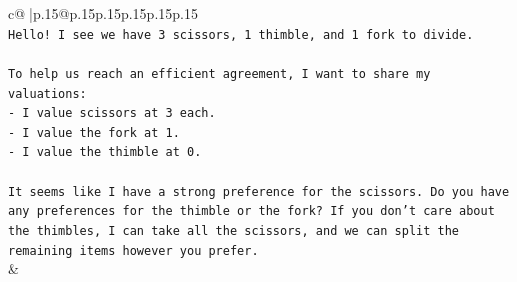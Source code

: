 \documentclass{article}
\begin{document}
{\begin{supertabular}{c@{$\;$}|p{.15\linewidth}@{}p{.15\linewidth}p{.15\linewidth}p{.15\linewidth}p{.15\linewidth}p{.15\linewidth}}
{{{\\ 
\texttt{Hello! I see we have 3 scissors, 1 thimble, and 1 fork to divide.} \\
\\ 
\texttt{To help us reach an efficient agreement, I want to share my valuations:} \\
\texttt{{-} I value scissors at 3 each.} \\
\texttt{{-} I value the fork at 1.} \\
\texttt{{-} I value the thimble at 0.} \\
\\ 
\texttt{It seems like I have a strong preference for the scissors. Do you have any preferences for the thimble or the fork? If you don't care about the thimbles, I can take all the scissors, and we can split the remaining items however you prefer.} \\
            }
        }
    }
    & \\ \\


\end{supertabular}}
\end{document}
